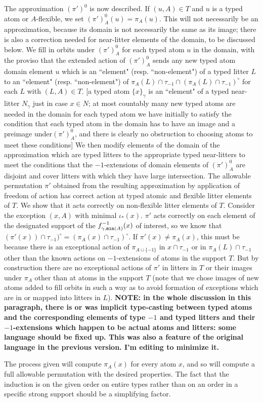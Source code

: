 \documentclass[112pt]{article}
\begin{document}
\begin{description}
The approximation $(\pi')^0$ is now described.  If $(u,A) \in T$ and $u$ is a typed atom or $A$-flexible, we set $(\pi')^0_A(u) = \pi_A(u)$.
This will not necessarily be an approximation, because its domain is not necessarily the same as its image;  there is also a correction needed for near-litter elements of the domain, to be discussed below.  We fill in orbits under $(\pi')^0_A$ for each
typed atom $u$ in the domain, with the proviso that the extended action of $(\pi')^0_A$ sends any new typed atom domain element $u$ which is an ``element" (resp. ``non-element") of a typed litter $L$ to an ``element" (resp. ``non-element") of $\pi_A(L)\cap \tau_{-1}\cap (\pi_A(L)\cap \tau_{-1})^\circ$ for each $L$ with $(L,A) \in T$.  [a typed atom $\{x\}_\gamma$ is an ``element" of a typed near-litter $N_\gamma$ just in case $x \in N$;  at most countably many new typed atoms are needed in the domain for each typed atom we have initially to satisfy the condition that each typed atom in the domain has to have an image and a preimage under$(\pi')^0_A$, and there is clearly no obstruction to choosing atoms to meet these conditions]
We then modify elements of the domain of the approximation which are typed litters to the appropriate typed near-litters to meet the conditions
that the $-1$-extensions of domain elements of $(\pi')^0_A$ are disjoint and cover litters with which they have large intersection.  The allowable permutation $\pi'$ obtained from the resulting
approximation by application of freedom of action has correct action at typed atomic and flexible litter elements of $T$.  We show that it acts correctly on non-flexible litter elements of $T$.  Consider the exception $(x,A)$ with minimal $\iota_*(x)$.  $\pi'$ acts correctly on each element of the designated support of the $f_{\gamma,{\tt min}(A)}^{-1}(x)$ of interest, so we know that $(\pi'(x))\cap \tau_{-1})^\circ=(\pi_A(x)\cap \tau_{-1})^\circ$.  If $\pi'(x) \neq \pi_A(x)$, this must be because there is an exceptional action of $\pi_{A \cup \{-1\}}$  in $x \cap \tau_{-1}$ or in $\pi_A(L)\cap \tau_{-1}$ other than the known actions on $-1$-extensions of atoms in the support $T$.  But by construction there are no exceptional actions of $\pi'$ in litters in $T$ or their images under $\pi_A$ other than at atoms in the support $T$ (note that we chose images of new atoms added to fill orbits in such a way as to avoid formation of exceptions which are in or mapped into litters in $L$).  {\bf NOTE: in the whole discussion in this paragraph, there is or was implicit type-casting between typed atoms and the corresponding elements of type $-1$ and typed litters and their $-1$-extensions which happen to be actual atoms and litters:  some language should be fixed up.  This was also a feature of the original language in the previous version.  I'm editing to minimize it.}

The process given will compute $\pi_A(x)$ for every atom $x$, and so will compute a full allowable permutation with the desired properties.  The fact
that the induction is on the given order on entire types rather than on an order in a specific strong support should be a simplifying factor.

\end{description}
\end{document}
